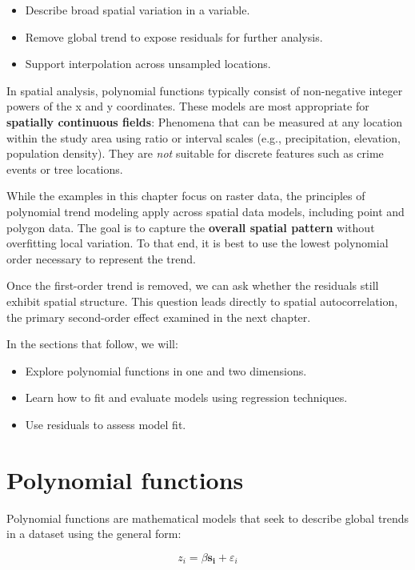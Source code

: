 \documentclass[
  letterpaper,
]{book}
\providecommand{\tightlist}{%
  \setlength{\itemsep}{0pt}\setlength{\parskip}{0pt}}
\begin{document}
\begin{itemize}
\tightlist
\item
  Describe broad spatial variation in a variable.
\item
  Remove global trend to expose residuals for further analysis.
\item
  Support interpolation across unsampled locations.
\end{itemize}

In spatial analysis, polynomial functions typically consist of
non-negative integer powers of the x and y coordinates. These models are
most appropriate for \textbf{spatially continuous fields}: Phenomena
that can be measured at any location within the study area using ratio
or interval scales (e.g., precipitation, elevation, population density).
They are \emph{not} suitable for discrete features such as crime events
or tree locations.

While the examples in this chapter focus on raster data, the principles
of polynomial trend modeling apply across spatial data models, including
point and polygon data. The goal is to capture the \textbf{overall
spatial pattern} without overfitting local variation. To that end, it is
best to use the lowest polynomial order necessary to represent the
trend.

Once the first-order trend is removed, we can ask whether the residuals
still exhibit spatial structure. This question leads directly to spatial
autocorrelation, the primary second-order effect examined in the next
chapter.

In the sections that follow, we will:

\begin{itemize}
\tightlist
\item
  Explore polynomial functions in one and two dimensions.
\item
  Learn how to fit and evaluate models using regression techniques.
\item
  Use residuals to assess model fit.
\end{itemize}

\section{Polynomial functions}\label{polynomial-functions}

Polynomial functions are mathematical models that seek to describe
global trends in a dataset using the general form:

\begin{equation}
\tag{1}
z_i = \beta \boldsymbol{s_i} + \varepsilon_i
\end{equation}
\end{document}
